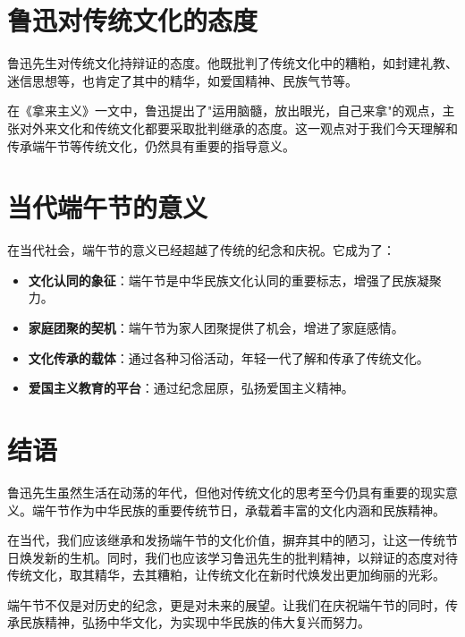\documentclass[12pt,a4paper]{article}
\begin{document}
\section{鲁迅对传统文化的态度}

鲁迅先生对传统文化持辩证的态度。他既批判了传统文化中的糟粕，如封建礼教、迷信思想等，也肯定了其中的精华，如爱国精神、民族气节等。

在《拿来主义》一文中，鲁迅提出了"运用脑髓，放出眼光，自己来拿"的观点，主张对外来文化和传统文化都要采取批判继承的态度。这一观点对于我们今天理解和传承端午节等传统文化，仍然具有重要的指导意义。

\section{当代端午节的意义}

在当代社会，端午节的意义已经超越了传统的纪念和庆祝。它成为了：

\begin{itemize}
    \item \textbf{文化认同的象征}：端午节是中华民族文化认同的重要标志，增强了民族凝聚力。
    \item \textbf{家庭团聚的契机}：端午节为家人团聚提供了机会，增进了家庭感情。
    \item \textbf{文化传承的载体}：通过各种习俗活动，年轻一代了解和传承了传统文化。
    \item \textbf{爱国主义教育的平台}：通过纪念屈原，弘扬爱国主义精神。
\end{itemize}

\section{结语}

鲁迅先生虽然生活在动荡的年代，但他对传统文化的思考至今仍具有重要的现实意义。端午节作为中华民族的重要传统节日，承载着丰富的文化内涵和民族精神。

在当代，我们应该继承和发扬端午节的文化价值，摒弃其中的陋习，让这一传统节日焕发新的生机。同时，我们也应该学习鲁迅先生的批判精神，以辩证的态度对待传统文化，取其精华，去其糟粕，让传统文化在新时代焕发出更加绚丽的光彩。

端午节不仅是对历史的纪念，更是对未来的展望。让我们在庆祝端午节的同时，传承民族精神，弘扬中华文化，为实现中华民族的伟大复兴而努力。
\end{document}
